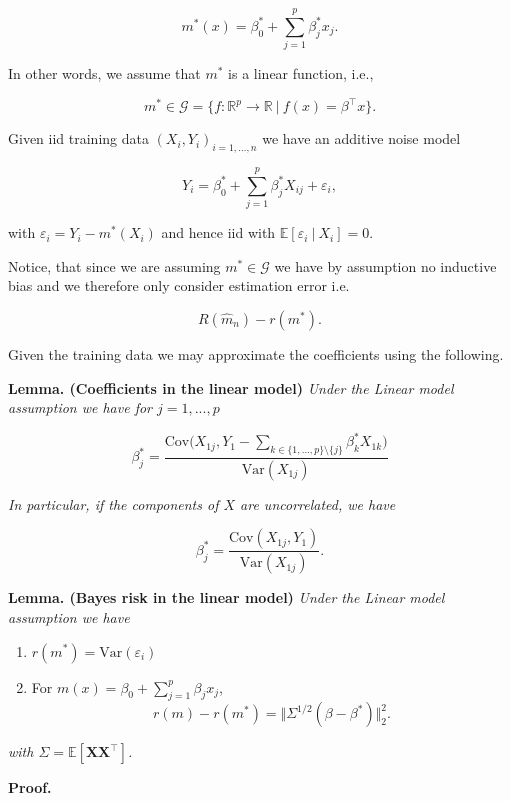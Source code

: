 \documentclass[
]{book}
\providecommand{\tightlist}{%
  \setlength{\itemsep}{0pt}\setlength{\parskip}{0pt}}
\begin{document}
\[
m^*(x)=\beta_0^*+\sum_{j=1}^{p}\beta_j^*x_j.
\]

In other words, we assume that \(m^*\) is a linear function, i.e.,

\[
m^*\in\mathcal{G}=\{f : \mathbb{R}^p\to \mathbb{R}\ \vert\ f(x)=\beta^\top x\}.
\]

Given iid training data \((X_i,Y_i)_{i=1,...,n}\) we have an additive noise model

\[
Y_i=\beta_0^*+\sum_{j=1}^{p}\beta_j^*X_{ij}+\varepsilon_i,
\]

with \(\varepsilon_i=Y_i-m^*(X_i)\) and hence iid with \(\mathbb{E}[\varepsilon_i\ \vert\ X_i]=0\).

Notice, that since we are assuming \(m^*\in\mathcal{G}\) we have by assumption no inductive bias and we therefore only consider estimation error i.e.

\[
R(\hat{m}_n)-r(m^*).
\]

Given the training data we may approximate the coefficients using the following.

\textbf{Lemma. (Coefficients in the linear model)} \emph{Under the Linear model assumption we have for \(j=1,...,p\)}

\[
\beta^*_j=\frac{\text{Cov}\Big(X_{1j},Y_1-\sum_{k\in \{1,...,p\}\setminus \{j\}} \beta_k^*X_{1k}\Big)}{\text{Var}(X_{1j})}
\]

\emph{In particular, if the components of \(X\) are uncorrelated, we have}

\[
\beta_j^*=\frac{\text{Cov}(X_{1j},Y_1)}{\text{Var}(X_{1j})}.
\]

\textbf{Lemma. (Bayes risk in the linear model)} \emph{Under the Linear model assumption we have}

\begin{enumerate}
\def\labelenumi{\arabic{enumi}.}
\tightlist
\item
  \(r(m^*)=\text{Var}(\varepsilon_i)\)
\item
  For \(m(x)=\beta_0+\sum_{j=1}^p \beta_jx_j\),
  \[
    r(m)-r(m^*)=\Vert\Sigma^{1/2}(\beta -\beta^*) \Vert^2_2.
    \]
\end{enumerate}

\emph{with \(\Sigma = \mathbb E[\mathbf X\mathbf X^\top]\).}

\textbf{Proof.}
\end{document}
